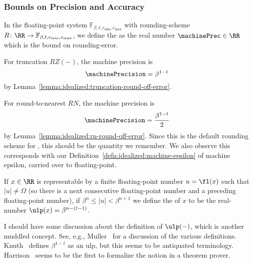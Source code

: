 \subsubsection{Bounds on Precision and Accuracy}

\begin{defn}
  In the floating-point system $\mathbb{F}_{\beta,t,e_{\text{min}},e_{\text{max}}}$
  with rounding-scheme $R\colon\RR\to\mathbb{F}_{\beta,t,e_{\text{min}},e_{\text{max}}}$,
  we define the \index{$\machinePrec$} as the real number
  $\machinePrec\in\RR$
  which is the bound on rounding-error.
\end{defn}


\begin{ex}
For truncation $RZ(-)$, the machine precision is
\begin{equation}
  \machinePrecision = \beta^{1-t}
\end{equation}
by Lemma~\ref{lemma:idealized:truncation-round-off-error}.
\end{ex}


\begin{ex}
For round-to-nearest $RN$, the machine precision is
\begin{equation}
  \machinePrecision = \frac{\beta^{1-t}}{2}
\end{equation}
by Lemma~\ref{lemma:idealized:rn-round-off-error}. Since this is the
default rounding scheme for , this should be the quantity we
remember. We also observe this corresponds with our
Definition~\ref{defn:idealized:machine-epsilon} of machine epsilon,
carried over to  floating-point.
\end{ex}


\begin{defn}
  If $x\in\RR$ is representable by a finite floating-point number
  $u=\fl(x)$ such that $|u|\neq\Omega$ (so there is a next consecutive
  floating-point number and a preceding floating-point number),
  if $\beta^{n}\leq |u| < \beta^{n+1}$
  we define the  of $x$ to be the real-number
  $\ulp(x) = \beta^{n-(t-1)}$.
\end{defn}

\begin{rmk}
I should have some discussion about the definition of $\ulp(-)$, which
is another muddled concept. See, e.g., Muller~\cite{muller2005ulp} for a
discussion of the various definitions. Knuth~\cite[pp.232--233]{taocp2}
defines $\beta^{1-t}$ as an ulp, but this seems to be antiquated terminology.
Harrison~\cite{harrison-hol99} seems to be the first to formalize the
notion in a theorem prover.
\end{rmk}

